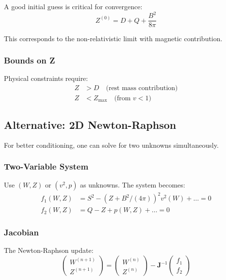 \documentclass[12pt,a4paper]{article}
\begin{document}
A good initial guess is critical for convergence:
\begin{equation}
Z^{(0)} = D + Q + \frac{B^2}{8\pi}
\label{eq:initial_guess}
\end{equation}

This corresponds to the non-relativistic limit with magnetic contribution.

\subsubsection{Bounds on Z}

Physical constraints require:
\begin{align}
Z &> D \quad \text{(rest mass contribution)} \\
Z &< Z_\text{max} \quad \text{(from } v < 1 \text{)}
\end{align}

\subsection{Alternative: 2D Newton-Raphson}

For better conditioning, one can solve for two unknowns simultaneously.

\subsubsection{Two-Variable System}

Use $(W, Z)$ or $(v^2, p)$ as unknowns. The system becomes:
\begin{align}
f_1(W, Z) &= S^2 - (Z + B^2/(4\pi))^2 v^2(W) + \ldots = 0 \\
f_2(W, Z) &= Q - Z + p(W, Z) + \ldots = 0
\end{align}

\subsubsection{Jacobian}

The Newton-Raphson update:
\begin{equation}
\begin{pmatrix} W^{(n+1)} \\ Z^{(n+1)} \end{pmatrix} =
\begin{pmatrix} W^{(n)} \\ Z^{(n)} \end{pmatrix} -
\bm{J}^{-1} \begin{pmatrix} f_1 \\ f_2 \end{pmatrix}
\end{equation}
\end{document}
